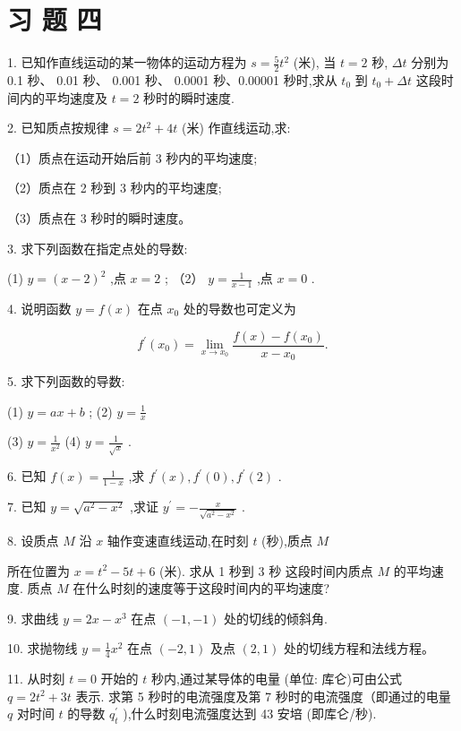 \documentclass[10pt]{article}
\begin{document}
\section*{习 题 四}

1. 已知作直线运动的某一物体的运动方程为 \(s = \frac{5}{2}{t}^{2}\) (米), 当 \(t = 2\) 秒, \({\Delta t}\) 分别为 0.1 秒、 0.01 秒、 0.001 秒、 0.0001 秒、0.00001 秒时,求从 \({t}_{0}\) 到 \({t}_{0} + {\Delta t}\) 这段时间内的平均速度及 \(t = 2\) 秒时的瞬时速度.

2. 已知质点按规律 \(s = 2{t}^{2} + {4t}\) (米) 作直线运动,求:

（1）质点在运动开始后前 3 秒内的平均速度;

（2）质点在 2 秒到 3 秒内的平均速度;

（3）质点在 3 秒时的瞬时速度。

3. 求下列函数在指定点处的导数:

(1) \(y = {\left( x - 2\right) }^{2}\) ,点 \(x = 2\) ; （2） \(y = \frac{1}{x - 1}\) ,点 \(x = 0\) .

4. 说明函数 \(y = f\left( x\right)\) 在点 \({x}_{0}\) 处的导数也可定义为

\[
{f}^{\prime }\left( {x}_{0}\right) = \mathop{\lim }\limits_{{x \rightarrow {x}_{0}}}\frac{f\left( x\right) - f\left( {x}_{0}\right) }{x - {x}_{0}}.
\]

5. 求下列函数的导数:

(1) \(y = {ax} + b\) ; (2) \(y = \frac{1}{x}\)

(3) \(y = \frac{1}{{x}^{2}}\) (4) \(y = \frac{1}{\sqrt{x}}\) .

6. 已知 \(f\left( x\right) = \frac{1}{1 - x}\) ,求 \({f}^{\prime }\left( x\right) ,{f}^{\prime }\left( 0\right) ,{f}^{\prime }\left( 2\right)\) .

7. 已知 \(y = \sqrt{{a}^{2} - {x}^{2}}\) ,求证 \({y}^{\prime } = - \frac{x}{\sqrt{{a}^{2} - {x}^{2}}}\) .

8. 设质点 \(M\) 沿 \(x\) 轴作变速直线运动,在时刻 \(t\) (秒),质点 \(M\)

所在位置为 \(x = {t}^{2} - {5t} + 6\) (米). 求从 1 秒到 3 秒 这段时间内质点 \(M\) 的平均速度. 质点 \(M\) 在什么时刻的速度等于这段时间内的平均速度?

9. 求曲线 \(y = {2x} - {x}^{3}\) 在点 \(\left( {-1, - 1}\right)\) 处的切线的倾斜角.

10. 求抛物线 \(y = \frac{1}{4}{x}^{2}\) 在点 \(\left( {-2,1}\right)\) 及点 \(\left( {2,1}\right)\) 处的切线方程和法线方程。

11. 从时刻 \(t = 0\) 开始的 \(t\) 秒内,通过某导体的电量 (单位: 库仑)可由公式 \(q = 2{t}^{2} + {3t}\) 表示. 求第 5 秒时的电流强度及第 7 秒时的电流强度（即通过的电量 \(q\) 对时间 \(t\) 的导数 \({q}_{t}^{\prime }\) ),什么时刻电流强度达到 43 安培 (即库仑/秒).
\end{document}
